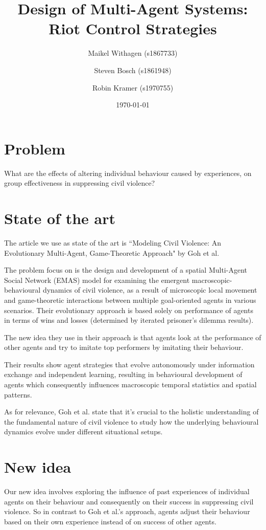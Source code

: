 \documentclass[11pt,a4paper]{article}
\title{Design of Multi-Agent Systems: Riot Control Strategies}
\author{Maikel Withagen (s1867733) \and Steven Bosch (s1861948) \and Robin Kramer (s1970755)}
\date{\today}
\begin{document}
	\maketitle
	
	\section{Problem}
		What are the effects of altering individual behaviour caused by experiences, on group effectiveness in suppressing civil violence?
		
	\section{State of the art}
		The article we use as state of the art is ``Modeling Civil Violence: An Evolutionary Multi-Agent, Game-Theoretic Approach" by Goh et al.
		
		The problem \citet{Goh} focus on is the design and development of a spatial Multi-Agent Social Network (EMAS) model for examining the emergent macroscopic-behavioural dynamics of civil violence, as a result of microscopic local movement and game-theoretic interactions between multiple goal-oriented agents in various scenarios. Their evolutionary approach is based solely on performance of agents in terms of wins and losses (determined by iterated prisoner's dilemma results). 
		
		The new idea they use in their approach is that agents look at the performance of other agents and try to imitate top performers by imitating their behaviour. 
		
		Their results show agent strategies that evolve autonomously under information exchange and independent learning, resulting in behavioural development of agents which consequently influences macroscopic temporal statistics and spatial patterns.
		
		As for relevance, Goh et al. state that it's crucial to the holistic understanding of the fundamental nature of civil violence to study how the underlying behavioural dynamics evolve under different situational setups.
		
	\section{New idea}
		Our new idea involves exploring the influence of past experiences of individual agents on their behaviour and consequently on their success in suppressing civil violence. So in contrast to Goh et al.'s approach, agents adjust their behaviour based on their own experience instead of on success of other agents. 
		
\end{document}
